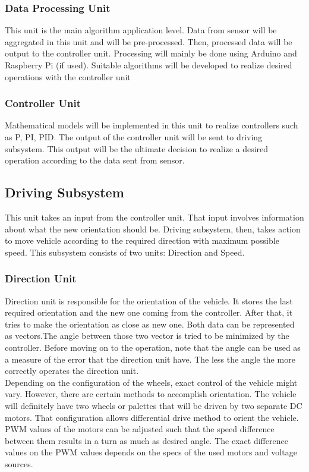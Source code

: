 \documentclass[a4paper,12pt]{article}
\begin{document}
\subsubsection{Data Processing Unit}
This unit is the main algorithm application level. Data from sensor will be aggregated in this unit and will be pre-processed. Then, processed data will be output to the controller unit. Processing will mainly be done using Arduino and Raspberry Pi (if used). Suitable algorithms will be developed to realize desired operations with the controller unit

\subsubsection{Controller Unit}
Mathematical models will be implemented in this unit to realize controllers such as P, PI, PID. The output of the controller unit will be sent to driving subsystem. This output will be the ultimate decision to realize a desired operation according to the data sent from sensor.

\subsection{Driving Subsystem}
This unit takes an input from the controller unit. That input involves information about what the new orientation should be. Driving subsystem, then, takes action to move vehicle according to the required direction with maximum possible speed. This subsystem consists of two units: Direction and Speed.
\subsubsection{Direction Unit}
Direction unit is responsible for the orientation of the vehicle. It stores the last required orientation and the new one coming from the controller. After that, it tries to make the orientation as close as new one. Both data can be represented as vectors.The angle between those two vector is tried to be minimized by the controller. Before moving on to the operation, note that the angle can be used as a measure of the error that the direction unit have. The less the angle the more correctly operates the direction unit.\\

Depending on the configuration of the wheels, exact control of the vehicle might vary. However, there are certain methods to accomplish orientation. The vehicle will definitely have two wheels or palettes that will be driven by two separate DC motors. That configuration allows differential drive method to orient the vehicle. PWM values of the motors can be adjusted such that the speed difference between them results in a turn as much as desired angle. The exact difference values on the PWM values depends on the specs of the used motors and voltage sources. \\
\end{document}
